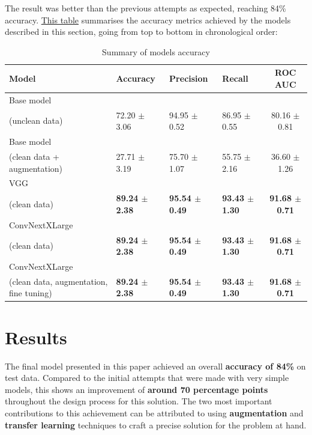 \documentclass[11pt]{article}
\begin{document}
\begin{multicols}{2}
		The result was better than the previous attempts as expected, reaching 84\% accuracy.
		 \hyperref[table:performances]{This table} summarises the accuracy metrics achieved by the models described in this section, going from top to bottom in chronological order:
   

        \begin{table}[t]
            \centering
            \label{table:performances}
            \setlength{\tabcolsep}{3pt}
            \caption{Summary of models accuracy}
            \begin{tabularx}{\textwidth}{lYYYc}
                \toprule
                Model & Accuracy & Precision & Recall & ROC AUC\\
                \midrule
                Base model \\ (unclean data)         &  72.20 $\pm$ 3.06    &   94.95 $\pm$ 0.52     &   86.95 $\pm$ 0.55    &   80.16 $\pm$ 0.81\\
                Base model \\ (clean data + augmentation)        &  27.71 $\pm$ 3.19    &   75.70 $\pm$ 1.07     &   55.75 $\pm$ 2.16    &   36.60 $\pm$ 1.26\\
                VGG \\ (clean data)    &  \textbf{89.24 $\pm$ 2.38}    &   \textbf{95.54 $\pm$ 0.49}     &   \textbf{93.43 $\pm$ 1.30}    &   \textbf{91.68 $\pm$ 0.71}\\
                ConvNextXLarge \\ (clean data)    &  \textbf{89.24 $\pm$ 2.38}    &   \textbf{95.54 $\pm$ 0.49}     &   \textbf{93.43 $\pm$ 1.30}    &   \textbf{91.68 $\pm$ 0.71}\\
                ConvNextXLarge \\ (clean data, augmentation, fine tuning)    &  \textbf{89.24 $\pm$ 2.38}    &   \textbf{95.54 $\pm$ 0.49}     &   \textbf{93.43 $\pm$ 1.30}    &   \textbf{91.68 $\pm$ 0.71}\\
                \bottomrule
            \end{tabularx}
            \label{tab:Performance}
        \end{table}

        


        \section{Results}
		The final model presented in this paper achieved an overall \textbf{accuracy of 84\%} on test data. Compared to the initial attempts that were made with very simple models, this shows an improvement of \textbf{around 70 percentage points} throughout the design process for this solution. The two most important contributions to this achievement can be attributed to using \textbf{augmentation} and \textbf{transfer learning} techniques to craft a precise solution for the problem at hand.
        

\end{multicols}
\end{document}
